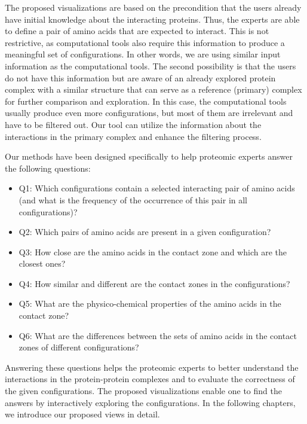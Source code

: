 \documentclass[twocolumn]{bmcart}%
\begin{document}
The proposed visualizations are based on the precondition that the users already have initial knowledge about the interacting proteins.
Thus, the experts are able to define a pair of amino acids that are expected to interact.
This is not restrictive, as computational tools also require this information to produce a meaningful set of configurations. 
In other words, we are using similar input information as the computational tools.
The second possibility is that the users do not have this information but are aware of an already explored protein complex with a similar structure that can serve as a reference (primary) complex for further comparison and exploration. 
In this case, the computational tools usually produce even more configurations, but most of them are irrelevant and have to be filtered out. 
Our tool can utilize the information about the interactions in the primary complex and enhance the filtering process.

Our methods have been designed specifically to help proteomic experts answer the following questions:
\begin{itemize}
\item Q1: Which configurations contain a selected interacting pair of amino acids (and what is the frequency of the occurrence of this pair in all configurations)?
\item Q2: Which pairs of amino acids are present in a given configuration?
\item Q3: How close are the amino acids in the contact zone and which are the closest ones?
\item Q4: How similar and different are the contact zones in the configurations?
\item Q5: What are the physico-chemical properties of the amino acids in the contact zone?
\item Q6: What are the differences between the sets of amino acids in the contact zones of different configurations?
\end{itemize}

Answering these questions helps the proteomic experts to better understand the interactions in the protein-protein complexes and to evaluate the correctness of the given configurations.
The proposed visualizations enable one to find the answers by interactively exploring the configurations.
In the following chapters, we introduce our proposed views in detail.
\end{document}
